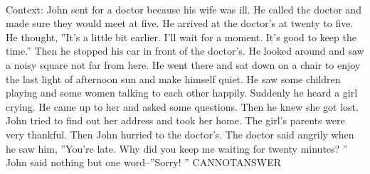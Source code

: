\documentclass[11pt,a4paper, onecolumn]{article}
\begin{document}
\\ Context: John sent for a doctor because his wife was ill. He called the doctor and made sure they would meet at five. He arrived at the doctor's at twenty to five. He thought, ''It's a little bit earlier. I'll wait for a moment. It's good to keep the time.'' Then he stopped his car in front of the doctor's. He looked around and saw a noisy square not far from here. He went there and sat down on a chair to enjoy the last light of afternoon sun and make himself quiet. He saw some children playing and some women talking to each other happily. Suddenly he heard a girl crying. He came up to her and asked some questions. Then he knew she got lost. John tried to find out her address and took her home. The girl's parents were very thankful. Then John hurried to the doctor's. The doctor said angrily when he saw him, ''You're late. Why did you keep me waiting for twenty minutes? '' John said nothing but one word--''Sorry! '' CANNOTANSWER
\end{document}
